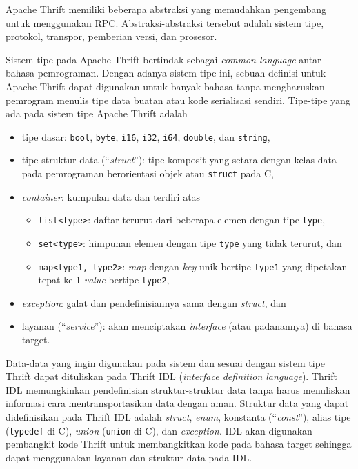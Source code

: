 Apache Thrift memiliki beberapa abstraksi yang memudahkan pengembang untuk
menggunakan RPC. Abstraksi-abstraksi tersebut adalah sistem tipe, protokol,
transpor, pemberian versi, dan prosesor.

Sistem tipe pada Apache Thrift bertindak sebagai \textit{common language}
antar-bahasa pemrograman. Dengan adanya sistem tipe ini, sebuah definisi untuk
Apache Thrift dapat digunakan untuk banyak bahasa tanpa mengharuskan pemrogram
menulis tipe data buatan atau kode serialisasi sendiri. Tipe-tipe yang ada pada
sistem tipe Apache Thrift adalah \parencite{agarwal_thrift}
\begin{itemize}
    \item tipe dasar: \texttt{bool}, \texttt{byte}, \texttt{i16},
          \texttt{i32}, \texttt{i64}, \texttt{double}, dan \texttt{string},
    \item tipe struktur data (``\textit{struct}''): tipe komposit yang setara
          dengan kelas data pada pemrograman berorientasi objek atau \texttt{struct}
          pada C,
    \item \textit{container}: kumpulan data dan terdiri atas
          \begin{itemize}
              \item \texttt{list<type>}: daftar terurut dari beberapa elemen
                    dengan tipe \texttt{type},
              \item \texttt{set<type>}: himpunan elemen dengan tipe
                    \texttt{type} yang tidak terurut, dan
              \item \texttt{map<type1, type2>}: \textit{map} dengan \textit{key}
                    unik bertipe \texttt{type1} yang di\-pe\-ta\-kan tepat ke 1
                    \textit{value} bertipe \texttt{type2},
          \end{itemize}
    \item \textit{exception}: galat dan pendefinisiannya sama dengan
          \textit{struct}, dan
    \item layanan (``\textit{service}''): akan menciptakan \textit{interface}
          (atau padanannya) di bahasa target.
\end{itemize}

Data-data yang ingin digunakan pada sistem dan sesuai dengan sistem tipe Thrift
dapat dituliskan pada Thrift IDL (\textit{interface definition language}).
Thrift IDL memungkinkan pendefinisian struktur-struktur data tanpa harus
menuliskan informasi cara mentransportasikan data dengan aman. Struktur data
yang dapat didefinisikan pada Thrift IDL adalah \textit{struct}, \textit{enum},
konstanta (``\textit{const}''), alias tipe (\texttt{typedef} di C), \textit{union}
(\texttt{union} di C), dan \textit{exception}. IDL akan digunakan pembangkit
kode Thrift untuk membangkitkan kode pada bahasa target sehingga dapat
menggunakan layanan dan struktur data pada IDL.

